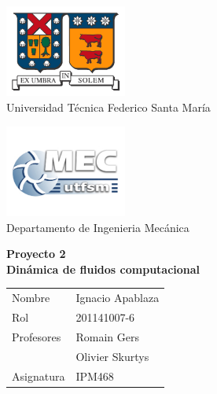 \documentclass[12pt, a4paper]{article}
\begin{document}
\thispagestyle{empty}

\hspace{-5mm}
\begin{minipage}[c]{7cm}
\centering
\includegraphics[width=4cm]{logoutfsm.jpg} \\
Universidad Técnica Federico Santa María
\end{minipage}
\hfill
\hspace{20mm}
\begin{minipage}[c]{7cm}
\centering
\includegraphics[width=4cm]{logomec1.jpg} \\
Departamento de Ingenieria Mecánica
\end{minipage}

\begin{center}
\vfill
 \Huge{{\bf Proyecto 2 }} \\ 
 \Huge{ {\bf Dinámica de fluidos computacional}} \\
\vfill
\end{center}

\vfill \hfill
\begin{tabular}{l @{ : } l}
Nombre &   Ignacio Apablaza \\
Rol & 201141007-6  \\
Profesores & Romain Gers \\
			& Olivier Skurtys \\
Asignatura & IPM468 \\
\end{tabular}

\newpage


\tableofcontents


\newpage


\newpage
\end{document}

